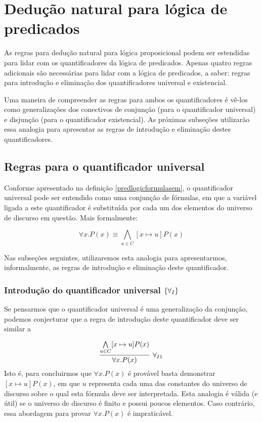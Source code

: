 \section{Dedução natural para lógica de predicados}

As regras para dedução natural para lógica proposicional podem ser
estendidas para lidar com os quantificadores da lógica de predicados.
Apenas quatro regras adicionais são necessárias para lidar com a
lógica de predicados, a saber: regras para introdução e eliminação dos
quantificadores universal e existencial.

Uma maneira de compreender as regras para ambos os quantificadores é
vê-los como generalizações dos conectivos de conjunção (para o
quantificador universal) e disjunção (para o quantificador
existencial). As próximas subseções utilizarão essa analogia para
apresentar as regras de introdução e eliminação destes
quantificadores.

\subsection{Regras para o quantificador universal}

Conforme apresentado na definição \ref{predlogicformulasem}, o
quantificador universal pode ser entendido como uma conjunção de
fórmulas, em que a variável ligada a este quantificador é substituída
por cada um dos elementos do universo de discurso em questão. Mais
formalmente:

\[\forall x. P(x) \equiv \bigwedge\limits_{u\in C}[x\mapsto u]P(x)\]

Nas subseções seguintes, utilizaremos esta analogia para
apresentarmos, informalmente, as regras de introdução e eliminação
deste quantificador.


\subsubsection{Introdução do quantificador universal $\scriptsize{\{\forall_I}\}$}

Se pensarmos que o quantificador universal é uma generalização da
conjunção, podemos conjecturar que a regra de introdução deste
quantificador deve ser similar a

\[
\infer[\forall_{I1}] {\forall x.P(x)}
                           {\bigwedge\limits_{u\in C}[x\mapsto u] P(x)}
\]
Isto é, para concluirmos que $\forall x.P(x)$ é provável basta
demonstrar $[x\mapsto u]P(x)$, em que $u$ representa cada uma das
constantes do universo de discurso sobre o qual esta
fórmula deve ser interpretada. Esta analogia é válida (e útil) se o
universo de discurso é finito e possui poucos elementos. Caso
contrário, essa abordagem para provar $\forall x. P(x)$ é
impraticável.

